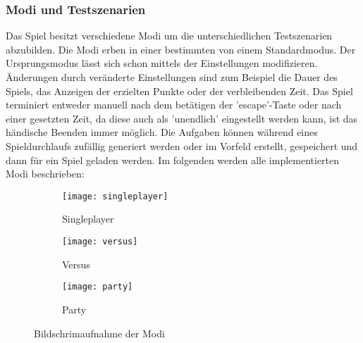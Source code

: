 \subsubsection{Modi und Testszenarien}
Das Spiel besitzt verschiedene Modi um die unterschiedlichen Testszenarien abzubilden. Die Modi erben in einer bestimmten von einem Standardmodus. Der Ursprungsmodus lässt sich schon mittels der Einstellungen modifizieren. Änderungen durch veränderte Einstellungen sind zum Beispiel die Dauer des Spiels, das Anzeigen der erzielten Punkte oder der verbleibenden Zeit. Das Spiel terminiert entweder manuell nach dem betätigen der 'escape'-Taste oder nach einer gesetzten Zeit, da diese auch als 'unendlich' eingestellt werden kann, ist das händische Beenden immer möglich. Die Aufgaben können während eines Spieldurchlaufs zufällig generiert werden oder im Vorfeld erstellt, gespeichert und dann für ein Spiel geladen werden. Im folgenden werden alle implementierten Modi beschrieben:\itemize
\begin{figure}[b]
	\centering	
	\begin{subfigure}[a]{0.3\linewidth}
		\texttt{[image: singleplayer]}
		\caption{Singleplayer}
		\label{fig:singleplayer}
	\end{subfigure}	
	\begin{subfigure}[a]{0.3\linewidth}
		\texttt{[image: versus]}
		\caption{Versus}
		\label{fig:versus}
	\end{subfigure}
	\begin{subfigure}[a]{0.3\linewidth}
		\texttt{[image: party]}
		\caption{Party}
		\label{fig:party}
	\end{subfigure}	
	\caption{Bildschrimaufnahme der Modi}
    \label{fig:modi}
\end{figure}

